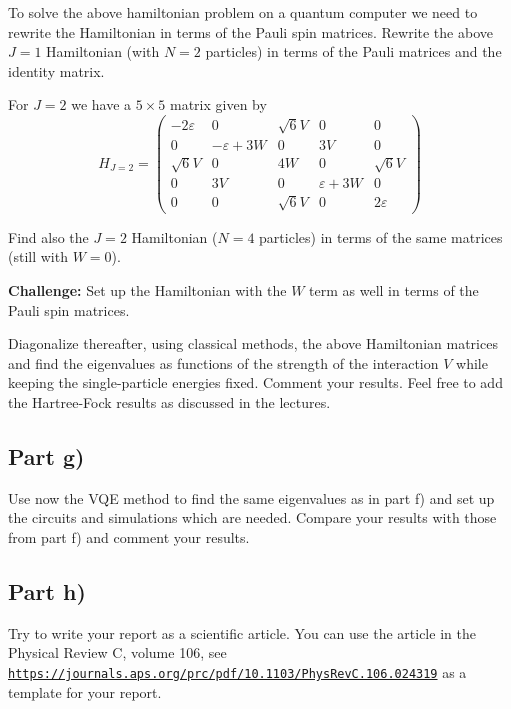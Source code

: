 \documentclass[%
oneside,                 %
final,                   %
10pt]{article}
\begin{document}
To solve the above hamiltonian problem on a quantum computer we need
to rewrite the Hamiltonian in terms of the Pauli spin
matrices. Rewrite the above $J=1$ Hamiltonian (with $N=2$ particles)
in terms of the Pauli matrices and the identity matrix.

For $J=2$ we have a $5\times 5$ matrix given by
\begin{equation}
H_{J = 2} =
\begin{pmatrix}
-2\varepsilon & 0 & \sqrt{6}V & 0 & 0 \\
0 & -\varepsilon + 3W & 0 & 3V & 0 \\
\sqrt{6}V & 0 & 4W & 0 & \sqrt{6}V \\
0 & 3V & 0 & \varepsilon + 3W & 0 \\
0 & 0 & \sqrt{6}V & 0 & 2\varepsilon
\end{pmatrix}
\end{equation}

Find also the $J=2$ Hamiltonian ($N=4$ particles) in terms of the same matrices (still with $W=0$).

\textbf{Challenge:} Set up the Hamiltonian with the $W$ term as well in terms of the Pauli spin matrices.

Diagonalize thereafter, using classical methods, the above Hamiltonian matrices and find the
eigenvalues as functions of the strength of the interaction $V$ while
keeping the single-particle energies fixed. Comment your results. Feel
free to add the Hartree-Fock results as discussed in the lectures.

\subsection{Part g)}

Use now the VQE method to find the same eigenvalues as in part f) and
set up the circuits and simulations which are needed. Compare your
results with those from part f) and comment your results.

\subsection{Part h)}

Try to write your report as a scientific article. You can use the article in the Physical Review C, volume 106, see \href{{https://journals.aps.org/prc/pdf/10.1103/PhysRevC.106.024319}}{\nolinkurl{https://journals.aps.org/prc/pdf/10.1103/PhysRevC.106.024319}} as a template for your report.
\end{document}
